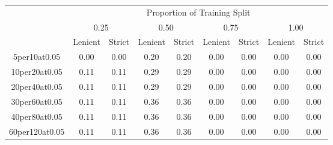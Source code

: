 \documentclass[12pt]{article}
\begin{document}
\begin{table}[]
    \begin{tabular}{|c|cc|cc|cc|cc|}
        \hline
        \textbf{}       & \multicolumn{8}{c|}{Proportion of Training Split}                                                                                                                                                                                          \\
                        & \multicolumn{2}{c}{0.25}                                 & \multicolumn{2}{c}{0.50}                                 & \multicolumn{2}{c}{0.75}                                 & \multicolumn{2}{c|}{1.00}                                 \\
                        & \multicolumn{1}{c}{Lenient} & \multicolumn{1}{c}{Strict} & \multicolumn{1}{c}{Lenient} & \multicolumn{1}{c}{Strict} & \multicolumn{1}{c}{Lenient} & \multicolumn{1}{c}{Strict} & \multicolumn{1}{c}{Lenient} & \multicolumn{1}{c|}{Strict} \\ \hline
        5per10at0.05    & 0.00                        & 0.00                       & 0.20                        & 0.20                       & 0.00                        & 0.00                       & 0.00                        & 0.00                       \\
        10per20at0.05   & 0.11                        & 0.11                       & 0.29                        & 0.29                       & 0.00                        & 0.00                       & 0.00                        & 0.00                       \\
        20per40at0.05   & 0.11                        & 0.11                       & 0.29                        & 0.29                       & 0.00                        & 0.00                       & 0.00                        & 0.00                       \\
        30per60at0.05   & 0.11                        & 0.11                       & 0.36                        & 0.36                       & 0.00                        & 0.00                       & 0.00                        & 0.00                       \\
        40per80at0.05   & 0.11                        & 0.11                       & 0.36                        & 0.36                       & 0.00                        & 0.00                       & 0.00                        & 0.00                       \\
        60per120at0.05  & 0.11                        & 0.11                       & 0.36                        & 0.36                       & 0.00                        & 0.00                       & 0.00                        & 0.00                       \\

\end{tabular}
\end{table}
\end{document}
